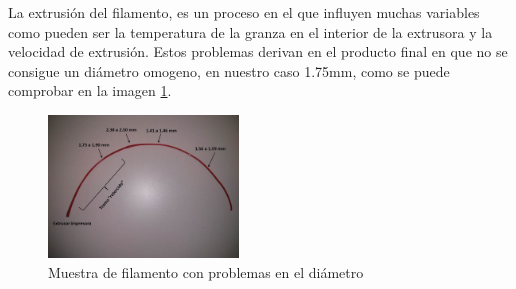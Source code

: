 La extrusión del filamento, es un proceso en el que influyen muchas variables como pueden ser la temperatura de la granza en el interior de la extrusora y la velocidad de extrusión. Estos problemas derivan en el producto final en que no se consigue un diámetro omogeno, en nuestro caso 1.75mm, como se puede comprobar en la imagen \ref{fig:muestra_filamento}.

\begin{figure}[H]
    \centering
    \includegraphics[width=0.45\textwidth]{images/atasco_rojo.jpg}
    \caption{Muestra de filamento con problemas en el diámetro}
    \label{fig:muestra_filamento}
\end{figure}

